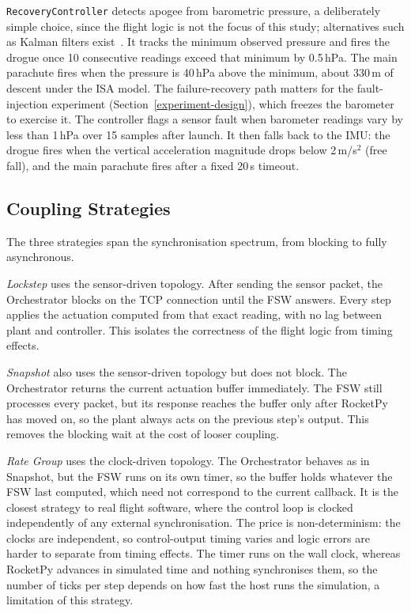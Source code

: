 \texttt{RecoveryController} detects apogee from barometric pressure, a deliberately simple choice, since the flight logic is not the focus of this study; alternatives such as Kalman filters exist~\cite{kimani2022detection}. It tracks the minimum observed pressure and fires the drogue once 10 consecutive readings exceed that minimum by 0.5\,hPa. The main parachute fires when the pressure is 40\,hPa above the minimum, about 330\,m of descent under the ISA model. The failure-recovery path matters for the fault-injection experiment (Section~\ref{experiment-design}), which freezes the barometer to exercise it. The controller flags a sensor fault when barometer readings vary by less than 1\,hPa over 15 samples after launch. It then falls back to the IMU: the drogue fires when the vertical acceleration magnitude drops below 2\,m/s$^2$ (free fall), and the main parachute fires after a fixed 20\,s timeout.

\subsection{Coupling Strategies}\label{coupling-strategies}
The three strategies span the synchronisation spectrum, from blocking to fully asynchronous.

\emph{Lockstep} uses the sensor-driven topology. After sending the sensor packet, the Orchestrator blocks on the TCP connection until the FSW answers. Every step applies the actuation computed from that exact reading, with no lag between plant and controller. This isolates the correctness of the flight logic from timing effects.

\emph{Snapshot} also uses the sensor-driven topology but does not block. The Orchestrator returns the current actuation buffer immediately. The FSW still processes every packet, but its response reaches the buffer only after RocketPy has moved on, so the plant always acts on the previous step's output. This removes the blocking wait at the cost of looser coupling.

\emph{Rate Group} uses the clock-driven topology. The Orchestrator behaves as in Snapshot, but the FSW runs on its own timer, so the buffer holds whatever the FSW last computed, which need not correspond to the current callback. It is the closest strategy to real flight software, where the control loop is clocked independently of any external synchronisation. The price is non-determinism: the clocks are independent, so control-output timing varies and logic errors are harder to separate from timing effects. The timer runs on the wall clock, whereas RocketPy advances in simulated time and nothing synchronises them, so the number of ticks per step depends on how fast the host runs the simulation, a limitation of this strategy.
